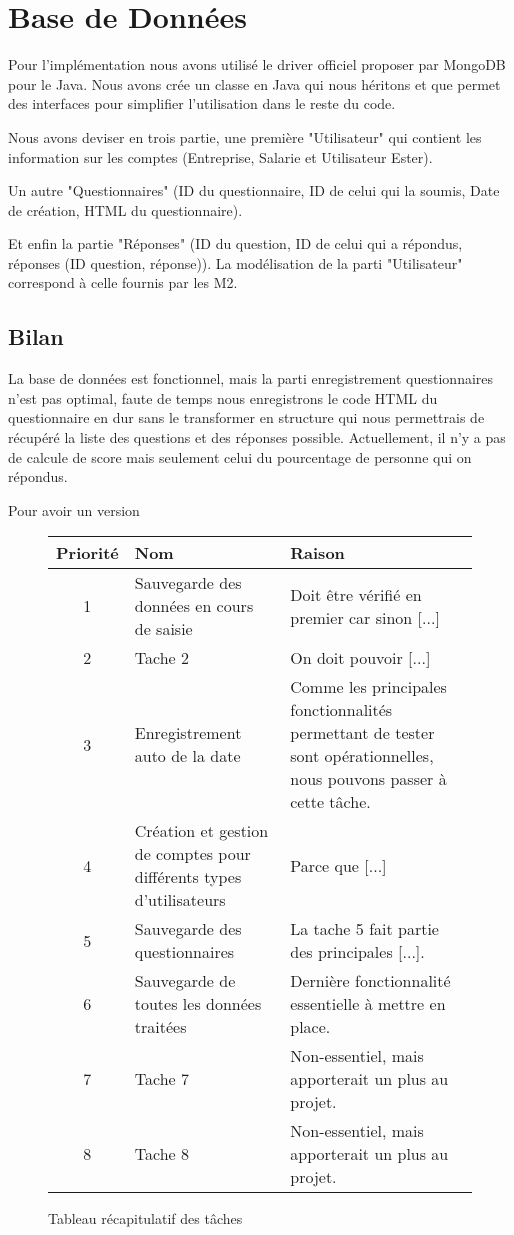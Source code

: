 \section{Base de Données}


Pour l'implémentation nous avons utilisé le driver officiel proposer par MongoDB pour le Java. Nous avons crée un classe en Java qui nous héritons et que permet des interfaces pour simplifier l'utilisation dans le reste du code.

Nous avons deviser en trois partie, une première "Utilisateur" qui contient les information sur les comptes (Entreprise, Salarie et Utilisateur Ester).

Un autre "Questionnaires" (ID du questionnaire, ID de celui qui la soumis, Date de création, HTML du questionnaire). 

Et enfin la partie "Réponses" (ID du question, ID de celui qui a répondus, réponses (ID question, réponse)). La modélisation de la parti "Utilisateur" correspond à celle fournis par les M2.

\subsection{Bilan}

La base de données est fonctionnel, mais la parti enregistrement questionnaires n'est pas optimal, faute de temps nous enregistrons le code HTML du questionnaire en dur sans le transformer en structure qui nous permettrais de récupéré la liste des questions et des réponses possible. Actuellement, il n'y a pas de calcule de score mais seulement celui du pourcentage de personne qui on répondus.

Pour avoir un version 

\begin{figure}[H]
    \begin{center}
        \begin{tabularx}{17cm}{|c|p{6cm}|X|}
            \hline
            Priorité & Nom & Raison\\
            \hline
            1 & Sauvegarde des données en cours
            de saisie & Doit être vérifié en premier car sinon [...] \tabularnewline
            2 & Tache 2 & On doit pouvoir [...] \tabularnewline
            3 & Enregistrement auto de la date & Comme les principales fonctionnalités permettant de tester sont opérationnelles, nous pouvons passer à cette tâche. \tabularnewline
            4 & Création et gestion de comptes
            pour différents types d’utilisateurs & Parce que [...] \tabularnewline
            5 & Sauvegarde des questionnaires & La tache 5 fait partie des principales [...]. \tabularnewline
            6 & Sauvegarde de toutes les données
            traitées & Dernière fonctionnalité essentielle à mettre en place. \tabularnewline
            7 & Tache 7 & Non-essentiel, mais apporterait un plus au projet. \tabularnewline
            8 & Tache 8 & Non-essentiel, mais apporterait un plus au projet. \tabularnewline
        \end{tabularx}
    \end{center}
    \caption{Tableau récapitulatif des tâches}
\end{figure}
